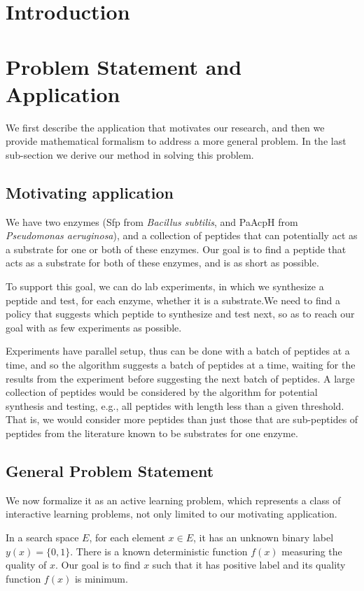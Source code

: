 \documentclass[12pt]{article}
\begin{document}
\section{Introduction}

\section{Problem Statement and Application}
We first describe the application that motivates our research, and then we provide mathematical formalism to address a more general problem. In the last sub-section we derive our method in solving this problem.

\subsection{Motivating application}
We have two enzymes (Sfp from {\it Bacillus subtilis}, and PaAcpH from {\it Pseudomonas aeruginosa}), and a collection of peptides that can potentially act as a substrate for one or both of these enzymes.  Our goal is to find a peptide that acts as a substrate for both of these enzymes, and is as short as possible.

To support this goal, we can do lab experiments, in which we synthesize a peptide and test, for each enzyme, whether it is a substrate.We need to find a policy that suggests which peptide to synthesize and test next, so as to reach our goal with as few experiments as possible.

Experiments have parallel setup, thus can be done with a batch of peptides at a time, and so the algorithm suggests a batch of peptides at a time, waiting for the results from the experiment before suggesting the next batch of peptides.
A large collection of peptides would be considered by the algorithm for potential synthesis and testing, e.g., all peptides with length less than a given threshold.  That is, we would consider more peptides than just those that are sub-peptides of peptides from the literature known to be substrates for one enzyme.

\subsection{General Problem Statement}
We now formalize it as an active learning problem, which represents a class of interactive learning problems, not only limited to our motivating application.

In a search space $E$, for each element $x \in E$, it has an unknown binary label $y(x)=\{0,1\}$. There is a known deterministic function $f(x)$ measuring the quality of $x$. Our goal is to find $x$ such that it has positive label and its quality function $f(x)$ is minimum.
\end{document}
